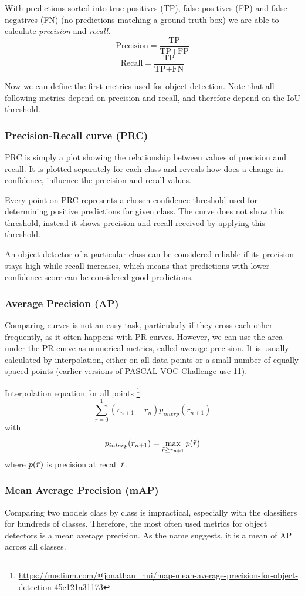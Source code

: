 With predictions sorted into true positives (TP), false positives (FP) and false negatives (FN) (no predictions matching a ground-truth box) we are able to calculate \textit{precision} and \textit{recall}.
$$\text{Precision} = \frac{\text{TP}}{\text{TP}+\text{FP}}$$
$$\text{Recall} = \frac{\text{TP}}{\text{TP}+\text{FN}}$$

Now we can define the first metrics used for object detection. Note that all following metrics depend on precision and recall, and therefore depend on the IoU threshold.

\subsubsection{Precision-Recall curve (PRC)}
PRC is simply a plot showing the relationship between values of precision and recall. It is plotted separately for each class and reveals how does a change in confidence, influence the precision and recall values. 

Every point on PRC represents a chosen confidence threshold used for determining positive predictions for given class. The curve does not show this threshold, instead it shows precision and recall received by applying this threshold.

An object detector of a particular class can be considered reliable if its precision stays high while recall increases, which means that predictions with lower confidence score can be considered good predictions.

\subsubsection{Average Precision (AP)}
Comparing curves is not an easy task, particularly if they cross each other frequently, as it often happens with PR curves. However, we can use the area under the PR curve as numerical metrics, called average precision. It is usually calculated by interpolation, either on all data points or a small number of equally spaced points (earlier versions of PASCAL VOC Challenge use 11).

Interpolation equation for all points \footnote{\url{https://medium.com/@jonathan\_hui/map-mean-average-precision-for-object-detection-45c121a31173}}:
$$\sum_{r=0}^1 (r_{n+1} - r_n ) p_{interp}(r_{n+1})$$
with
$$p_{interp}(r_{n+1}) = \max_{\Tilde{r} \geq r_{n+1}} p(\Tilde{r})$$
where $p(\Tilde{r})$ is precision at recall $\Tilde{r}$.

\subsubsection{Mean Average Precision (mAP)}
Comparing two models class by class is impractical, especially with the classifiers for hundreds of classes. Therefore, the most often used metrics for object detectors is a mean average precision. As the name suggests, it is a mean of AP across all classes.

